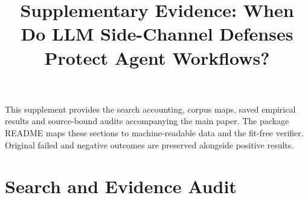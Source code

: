 \documentclass[conference,compsoc]{IEEEtran}
\title{Supplementary Evidence: When Do LLM Side-Channel Defenses Protect Agent Workflows?}
\author{}
\begin{document}
\maketitle
This supplement provides the search accounting, corpus maps, saved empirical results and source-bound audits accompanying the main paper. The package README maps these sections to machine-readable data and the fit-free verifier. Original failed and negative outcomes are preserved alongside positive results.
\section{Search and Evidence Audit}\label{app:search}





















\end{document}
